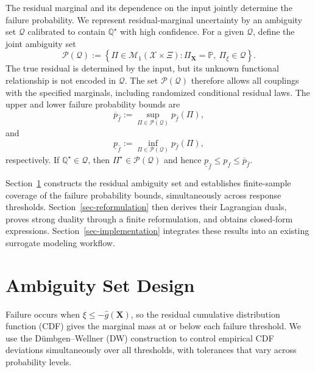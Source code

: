 \documentclass[review,11pt,3p,authoryear,nopreprintline]{elsarticle}
\begin{document}
The residual marginal and its dependence on the input jointly determine the failure probability. We represent residual-marginal uncertainty by an ambiguity set $\mathcal Q$ calibrated to contain $\mathbb Q^\star$ with high confidence. For a given $\mathcal Q$, define the joint ambiguity set
\[
  \mathcal P(\mathcal Q) :=\left\{\Pi\in\mathcal M_1(\mathcal X\times\Xi):\Pi_{\bm X}=\mathbb P,\ \Pi_\xi\in\mathcal Q\right\}.
\]
The true residual is determined by the input, but its unknown functional relationship is not encoded in $\mathcal Q$. The set $\mathcal P(\mathcal Q)$ therefore allows all couplings with the specified marginals, including randomized conditional residual laws. The upper and lower failure probability bounds are
\begin{equation}
  \overline p_{\hat f}:=\sup_{\Pi\in\mathcal P(\mathcal Q)}p_{\hat f}(\Pi),
  \label{eq-upper-bound}
\end{equation}
and
\begin{equation}
  \underline p_{\hat f}:=\inf_{\Pi\in\mathcal P(\mathcal Q)}p_{\hat f}(\Pi),
  \label{eq-lower-bound}
\end{equation}
respectively. If $\mathbb Q^\star\in\mathcal Q$, then $\Pi^\star\in\mathcal P(\mathcal Q)$ and hence $\underline p_{\hat f}\le p_f\le\overline p_{\hat f}$.


Section~\ref{sec-ambiguity-set} constructs the residual ambiguity set and establishes finite-sample coverage of the failure probability bounds, simultaneously across response thresholds. Section~\ref{sec-reformulation} then derives their Lagrangian duals, proves strong duality through a finite reformulation, and obtains closed-form expressions. Section~\ref{sec-implementation} integrates these results into an existing surrogate modeling workflow.


\section{Ambiguity Set Design}
\label{sec-ambiguity-set}

Failure occurs when $\xi\le-\hat g(\bm X)$, so the residual cumulative distribution function (CDF) gives the marginal mass at or below each failure threshold. We use the D\"umbgen--Wellner (DW) construction \citep{L.J23} to control empirical CDF deviations simultaneously over all thresholds, with tolerances that vary across probability levels.
\end{document}
